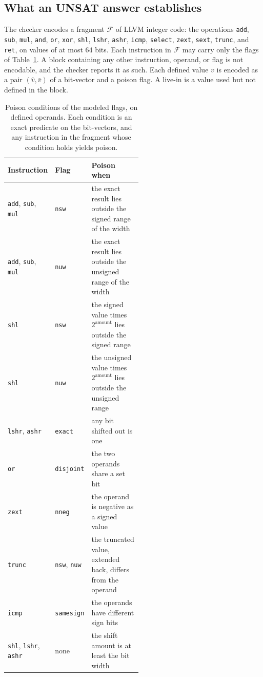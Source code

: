 \subsection{What an UNSAT answer establishes}
\label{sec:unsat}

The checker encodes a fragment $\mathcal{F}$ of LLVM integer code: the operations \texttt{add}, \texttt{sub}, \texttt{mul},
\texttt{and}, \texttt{or}, \texttt{xor}, \texttt{shl}, \texttt{lshr}, \texttt{ashr}, \texttt{icmp}, \texttt{select},
\texttt{zext}, \texttt{sext}, \texttt{trunc}, and \texttt{ret}, on values of at most $64$ bits. Each instruction in
$\mathcal{F}$ may carry only the flags of Table~\ref{tab:flags}. A block containing any other instruction, operand, or
flag is not encodable, and the checker reports it as such. Each defined value $v$ is encoded as a pair $(\hat v,\bar v)$
of a bit-vector and a poison flag. A live-in is a value used but not defined in the block.

\begin{table}[t]
\centering
  \caption{Poison conditions of the modeled flags, on defined operands. Each condition is an exact predicate on the
  bit-vectors, and any instruction in the fragment whose condition holds yields poison.}
  \label{tab:flags}
  \begin{tabular}{|l|l|p{0.52\linewidth}|}
    \hline
    Instruction & Flag & Poison when \\
    \hline
    \texttt{add}, \texttt{sub}, \texttt{mul} & \texttt{nsw} & the exact result lies outside the signed range of the width \\
    \hline
    \texttt{add}, \texttt{sub}, \texttt{mul} & \texttt{nuw} & the exact result lies outside the unsigned range of the width \\
    \hline
    \texttt{shl} & \texttt{nsw} & the signed value times $2^{\text{amount}}$ lies outside the signed range \\
    \hline
    \texttt{shl} & \texttt{nuw} & the unsigned value times $2^{\text{amount}}$ lies outside the unsigned range \\
    \hline
    \texttt{lshr}, \texttt{ashr} & \texttt{exact} & any bit shifted out is one \\
    \hline
    \texttt{or} & \texttt{disjoint} & the two operands share a set bit \\
    \hline
    \texttt{zext} & \texttt{nneg} & the operand is negative as a signed value \\
    \hline
    \texttt{trunc} & \texttt{nsw}, \texttt{nuw} & the truncated value, extended back, differs from the operand \\
    \hline
    \texttt{icmp} & \texttt{samesign} & the operands have different sign bits \\
    \hline
    \hline
    \texttt{shl}, \texttt{lshr}, \texttt{ashr} & none & the shift amount is at least the bit width \\
    \hline
  \end{tabular}
\end{table}

